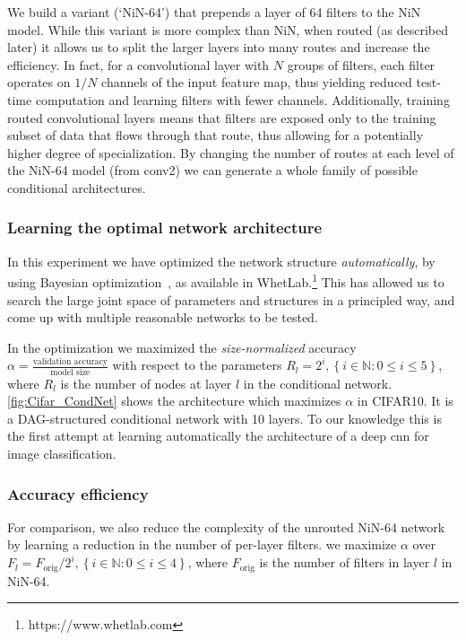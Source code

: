 \documentclass[thesis]{subfiles}
\begin{document}
	We build a variant (`NiN-64') that prepends a layer of 64 filters to the NiN model.
	While this variant is more complex than NiN, when routed (as described later) it allows us 
	to split the larger layers into many routes and increase the efficiency.
	In fact, for a convolutional layer with $N$ groups of filters, each filter operates on $1/N$ channels of the input feature map, thus yielding reduced test-time computation and learning filters with fewer channels. 
	Additionally, training routed convolutional layers means that filters are exposed only to the training subset of data that flows through that route, thus allowing for a potentially higher degree of specialization.
	By changing the number of routes at each level of the NiN-64 model (from conv2) we can 
	generate a whole family of possible conditional architectures. 
	
	\subsubsection{Learning the optimal network architecture}
	In this experiment we have optimized the network structure {\em automatically}, 
	by using Bayesian optimization~\citep{Snoek2012}, as available in WhetLab.\footnote{https://www.whetlab.com} 
	This has allowed us to search the large joint space of parameters and structures in a principled way, 
	and come up with multiple reasonable networks to be tested. 
	
	In the optimization we maximized the {\em size-normalized} accuracy $\alpha =\frac{\textrm{validation accuracy}}{\textrm{model size}}$ with respect to the parameters $R_l = 2^i, \left\{i\in \mathbb{N} : 0 \le i \le 5\right\}$, where $R_l$ is the number of nodes at layer $l$ in the conditional network. 
	\cref{fig:Cifar_CondNet} shows the architecture which maximizes $\alpha$ in CIFAR10. 
	It is a DAG-structured conditional network with 10 layers.
	To our knowledge this is the first attempt at learning automatically the architecture of a deep \gls{cnn} for image classification.
	
	\subsubsection{Accuracy \vs{}efficiency}
	For comparison, we also reduce the complexity of the unrouted NiN-64 network by learning a reduction in the number of per-layer filters. 
	\ie we maximize $\alpha$ over $F_l = F_\textrm{orig}/2^i, \left\{i\in \mathbb{N} : 0 \le i \le 4\right\}$, where $F_\textrm{orig}$ is the number of filters in layer $l$ in NiN-64. 
	
\end{document}
